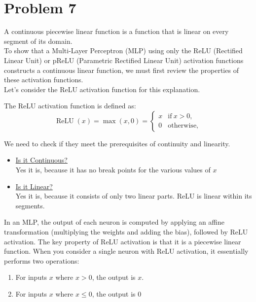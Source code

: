 \section{Problem 7}
A continuous piecewise linear function is a function that is linear on every segment of its domain.\\
To show that a Multi-Layer Perceptron (MLP) using only the ReLU (Rectified Linear Unit) or pReLU (Parametric Rectified Linear Unit) activation functions constructs a continuous linear function, we must first review the properties of these activation functions. \\

Let’s consider the ReLU activation function for this explanation.

The ReLU activation function is defined as:\\
\begin{equation}
	\operatorname{ReLU}(x)=\operatorname*{max}(x,0)={\left\{\begin{array}{ll}
			{x}&{{\mathrm{if~}}x>0,}\\ 
			{0}&{{\mathrm{otherwise,}}}
			\end{array}\right.}		
\end{equation}

We need to check if they meet the prerequisites of continuity and linearity.
\begin{itemize}
	\item \underline{Is it Continuous?}\\
	Yes it is, because it has no break points for the various values of $x$
	\item \underline{Is it Linear?}\\
	Yes it is, because it consists of only two linear parts. ReLU is linear within its segments.
\end{itemize}

In an MLP, the output of each neuron is computed by applying an affine transformation (multiplying the weights and adding the bias), followed by ReLU activation. The key property of ReLU activation is that it is a piecewise linear function.
When you consider a single neuron with ReLU activation, it essentially performs two operations:
\begin{enumerate}
	\item For inputs $x$ where $x > 0$, the output is $x$.
	\item For inputs $x$ where $x \leq 0$, the output is $0$
\end{enumerate}

